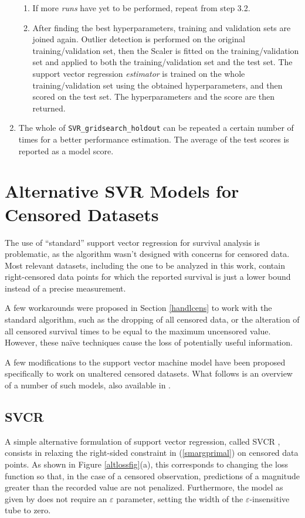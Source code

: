 \documentclass[12pt]{report}
\begin{document}
\begin{enumerate}
\begin{enumerate}
\item If more \textit{runs} have yet to be performed, repeat from step 3.2.
\item After finding the best hyperparameters, training and validation sets are joined again. Outlier detection is performed on the original training/validation set, then the Scaler is fitted on the training/validation set and applied to both the training/validation set and the test set. The support vector regression \textit{estimator} is trained on the whole training/validation set using the obtained hyperparameters, and then scored on the test set. The hyperparameters and the score are then returned.
\end{enumerate}
\item The whole of \texttt{SVR\_gridsearch\_holdout} can be repeated a certain number of times for a better performance estimation. The average of the test scores is reported as a model score.
\end{enumerate}

\chapter{Alternative SVR Models for Censored Datasets}
\label{chaltsvr}
The use of ``standard'' support vector regression for survival analysis is problematic, as the algorithm wasn't designed with concerns for censored data. Most relevant datasets, including the one to be analyzed in this work, contain right-censored data points for which the reported survival is just a lower bound instead of a precise measurement.

A few workarounds were proposed in Section \ref{handlcens} to work with the standard algorithm, such as the dropping of all censored data, or the alteration of all censored survival times to be equal to the maximum uncensored value. However, these naïve techniques cause the loss of potentially useful information.

A few modifications to the support vector machine model have been proposed specifically to work on unaltered censored datasets. What follows is an overview of a number of such models, also available in \cite{vanbelle11}.

\section{SVCR}
A simple alternative formulation of support vector regression, called SVCR \cite{shivaswamy07}, consists in relaxing the right-sided constraint in (\ref{smargprimal}) on censored data points. As shown in Figure \ref{altlossfig}(a), this corresponds to changing the loss function so that, in the case of a censored observation, predictions of a magnitude greater than the recorded value are not penalized. Furthermore, the model as given by \cite{vanbelle11} does not require an $\varepsilon$ parameter, setting the width of the $\varepsilon$-insensitive tube to zero.
\end{document}

